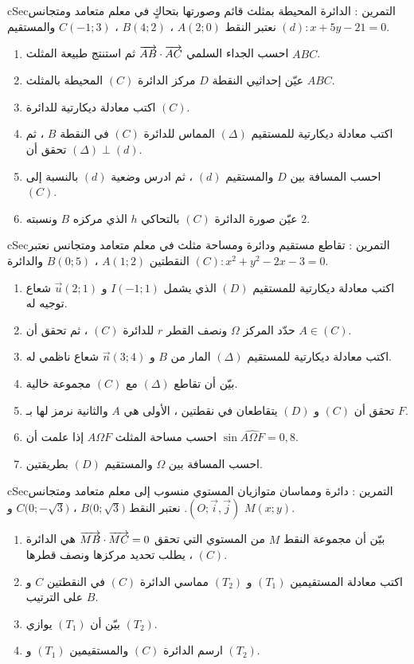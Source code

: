 \documentclass[12pt,a4paper]{article}
\newenvironment{BOX}[2]{\begin{otherlanguage}{english}\begin{arbox}{#1}{#2}}{\end{arbox}\end{otherlanguage}}
\newcounter{exo}
\newenvironment{tamrin}[1]{\stepcounter{exo}\begin{BOX}{cSec}{التمرين \theexo: #1}}{\end{BOX}}
\begin{document}
\begin{tamrin}{الدائرة المحيطة بمثلث قائم وصورتها بتحاكٍ}
في معلم متعامد ومتجانس نعتبر النقط $A(2;0)$ ، $B(4;2)$ ، $C(-1;3)$ والمستقيم $(d):x+5y-21=0$.
\begin{enumerate}
\item احسب الجداء السلمي $\overrightarrow{AB}\cdot\overrightarrow{AC}$ ثم استنتج طبيعة المثلث $ABC$.
\item عيّن إحداثيي النقطة $D$ مركز الدائرة $(C)$ المحيطة بالمثلث $ABC$.
\item اكتب معادلة ديكارتية للدائرة $(C)$.
\item اكتب معادلة ديكارتية للمستقيم $(\Delta)$ المماس للدائرة $(C)$ في النقطة $B$ ، ثم تحقق أن $(\Delta)\perp(d)$.
\item احسب المسافة بين $D$ والمستقيم $(d)$ ، ثم ادرس وضعية $(d)$ بالنسبة إلى $(C)$.
\item عيّن صورة الدائرة $(C)$ بالتحاكي $h$ الذي مركزه $B$ ونسبته $2$.
\end{enumerate}
\end{tamrin}

\begin{tamrin}{تقاطع مستقيم ودائرة ومساحة مثلث}
في معلم متعامد ومتجانس نعتبر النقطتين $A(1;2)$ ، $B(0;5)$ والدائرة $(C):x^2+y^2-2x-3=0$.
\begin{enumerate}
\item اكتب معادلة ديكارتية للمستقيم $(D)$ الذي يشمل $I(-1;1)$ و $\vec u(2;1)$ شعاع توجيه له.
\item حدّد المركز $\Omega$ ونصف القطر $r$ للدائرة $(C)$ ، ثم تحقق أن $A\in(C)$.
\item اكتب معادلة ديكارتية للمستقيم $(\Delta)$ المار من $B$ و $\vec n(3;4)$ شعاع ناظمي له.
\item بيّن أن تقاطع $(\Delta)$ مع $(C)$ مجموعة خالية.
\item تحقق أن $(C)$ و $(D)$ يتقاطعان في نقطتين ، الأولى هي $A$ والثانية نرمز لها بـ $F$.
\item احسب مساحة المثلث $A\Omega F$ إذا علمت أن $\sin\widehat{A\Omega F}=0{,}8$.
\item احسب المسافة بين $\Omega$ والمستقيم $(D)$ بطريقتين.
\end{enumerate}
\end{tamrin}

\begin{tamrin}{دائرة ومماسان متوازيان}
المستوي منسوب إلى معلم متعامد ومتجانس $(O;\vec i,\vec j)$. نعتبر النقط $B\big(0;\sqrt3\big)$ ، $C\big(0;-\sqrt3\big)$ و $M(x;y)$.
\begin{enumerate}
\item بيّن أن مجموعة النقط $M$ من المستوي التي تحقق $\overrightarrow{MB}\cdot\overrightarrow{MC}=0$ هي الدائرة $(C)$ ، يطلب تحديد مركزها ونصف قطرها.
\item اكتب معادلة المستقيمين $(T_1)$ و $(T_2)$ مماسي الدائرة $(C)$ في النقطتين $C$ و $B$ على الترتيب.
\item بيّن أن $(T_1)$ يوازي $(T_2)$.
\item ارسم الدائرة $(C)$ والمستقيمين $(T_1)$ و $(T_2)$.
\end{enumerate}
\end{tamrin}
\end{document}
